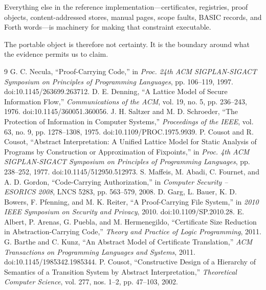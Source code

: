\documentclass[11pt]{article}
\begin{document}
Everything else in the reference implementation---certificates, registries, proof objects, content-addressed stores, manual pages, scope faults, BASIC records, and Forth words---is machinery for making that constraint executable.

The portable object is therefore not certainty. It is the boundary around what the evidence permits us to claim.

\appendix







\begin{thebibliography}{9}
 G. C. Necula, ``Proof-Carrying Code,'' in \emph{Proc. 24th ACM SIGPLAN-SIGACT Symposium on Principles of Programming Languages}, pp. 106--119, 1997. doi:10.1145/263699.263712.
 D. E. Denning, ``A Lattice Model of Secure Information Flow,'' \emph{Communications of the ACM}, vol. 19, no. 5, pp. 236--243, 1976. doi:10.1145/360051.360056.
 J. H. Saltzer and M. D. Schroeder, ``The Protection of Information in Computer Systems,'' \emph{Proceedings of the IEEE}, vol. 63, no. 9, pp. 1278--1308, 1975. doi:10.1109/PROC.1975.9939.
 P. Cousot and R. Cousot, ``Abstract Interpretation: A Unified Lattice Model for Static Analysis of Programs by Construction or Approximation of Fixpoints,'' in \emph{Proc. 4th ACM SIGPLAN-SIGACT Symposium on Principles of Programming Languages}, pp. 238--252, 1977. doi:10.1145/512950.512973.
 S. Maffeis, M. Abadi, C. Fournet, and A. D. Gordon, ``Code-Carrying Authorization,'' in \emph{Computer Security -- ESORICS 2008}, LNCS 5283, pp. 563--579, 2008.
 D. Garg, L. Bauer, K. D. Bowers, F. Pfenning, and M. K. Reiter, ``A Proof-Carrying File System,'' in \emph{2010 IEEE Symposium on Security and Privacy}, 2010. doi:10.1109/SP.2010.28.
 E. Albert, P. Arenas, G. Puebla, and M. Hermenegildo, ``Certificate Size Reduction in Abstraction-Carrying Code,'' \emph{Theory and Practice of Logic Programming}, 2011.
 G. Barthe and C. Kunz, ``An Abstract Model of Certificate Translation,'' \emph{ACM Transactions on Programming Languages and Systems}, 2011. doi:10.1145/1985342.1985344.
 P. Cousot, ``Constructive Design of a Hierarchy of Semantics of a Transition System by Abstract Interpretation,'' \emph{Theoretical Computer Science}, vol. 277, nos. 1--2, pp. 47--103, 2002.

\end{thebibliography}
\end{document}
